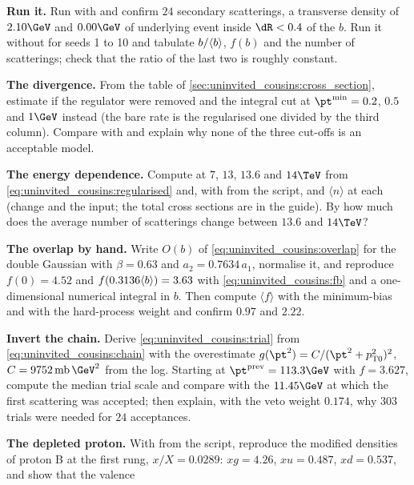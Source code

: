 \begin{exercises}
\item \textbf{Run it.} Run 
  with  and confirm $24$ secondary scatterings, a
  transverse density of $2.10\GeV$ and $0.00\GeV$ of underlying event
  inside $\dR<0.4$ of the $b$. Run it without  for seeds 1
  to 10 and tabulate $b/\langle b\rangle$, $f(b)$ and the number of scatterings;
  check that the ratio of the last two is roughly constant.
\item \textbf{The divergence.} From the table of
  \cref{sec:uninvited_cousins:cross_section}, estimate \sigint if the
  regulator were removed and the integral cut at $\pt^{\min}=0.2$, $0.5$
  and $1\GeV$ instead (the bare rate is the regularised one divided by the
  third column). Compare with \signd and explain why none of the three
  cut-offs is an acceptable model.
\item \textbf{The energy dependence.} Compute \ptzero at $7$, $13$, $13.6$
  and $14\TeV$ from \cref{eq:uninvited_cousins:regularised} and, with
   from the script, \sigint and $\langle n\rangle$ at each
  (change  and the  input; the total cross
  sections are in the \PYTHIA guide). By how much does the average number
  of scatterings change between $13.6$ and $14\TeV$?
\item \textbf{The overlap by hand.} Write $O(b)$ of
  \cref{eq:uninvited_cousins:overlap} for the double Gaussian with
  $\beta=0.63$ and $a_2=0.7634\,a_1$, normalise it, and reproduce $f(0)=4.52$
  and $f(0.3136\langle b\rangle)=3.63$ with \cref{eq:uninvited_cousins:fb} and a
  one-dimensional numerical integral in $b$. Then compute $\langle f\rangle$
  with the minimum-bias and with the hard-process weight and confirm
  $0.97$ and $2.22$.
\item \textbf{Invert the chain.} Derive \cref{eq:uninvited_cousins:trial}
  from \cref{eq:uninvited_cousins:chain} with the overestimate
  $g(\pt^2)=C/(\pt^2+\ptzero^2)^2$, $C=9752\,\mathrm{mb}\,\GeV^2$ from the
  log. Starting at $\pt^{\mathrm{prev}}=113.3\GeV$ with $f=3.627$, compute
  the median trial scale and compare with the $11.45\GeV$ at which the
  first scattering was accepted; then explain, with the veto weight
  $0.174$, why $303$ trials were needed for $24$ acceptances.
\item \textbf{The depleted proton.} With  from the script,
  reproduce the modified densities of proton B at the first rung,
  $x/X=0.0289$: $xg=4.26$, $xu=0.487$, $xd=0.537$, and show that the valence

\end{exercises}
